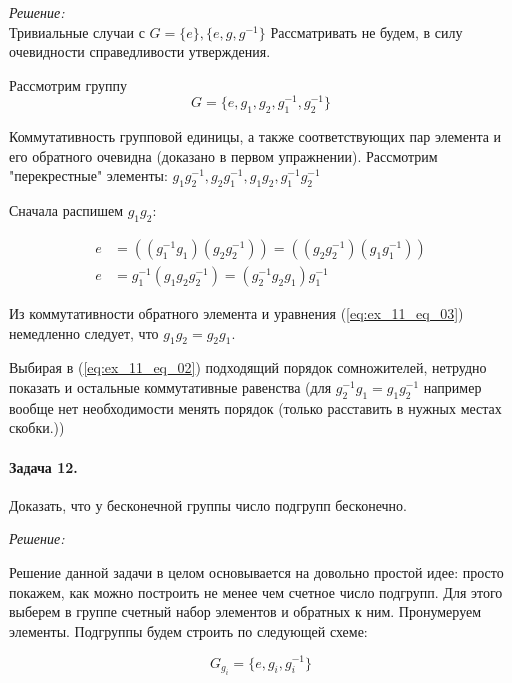 \documentclass[10pt,a4paper]{article}
\begin{document}
	\textit{Решение:}\\
	
	Тривиальные случаи с $G = \lbrace e \rbrace, \lbrace e, g, g^{-1}\rbrace$ 
	Рассматривать не будем, в силу очевидности справедливости утверждения.
	
	Рассмотрим группу 
	\begin{equation}
		\label{eq:ex_11_eq_01}
		G = \lbrace e, g_{1}, g_{2}, g^{-1}_{1}, g^{-1}_{2}\rbrace
	\end{equation}
	
	Коммутативность групповой единицы, а также соответствующих пар элемента и 
	его обратного очевидна (доказано в первом упражнении). Рассмотрим 
	"перекрестные" элементы: $g_{1}g_{2}^{-1}, g_{2}g_{1}^{-1}, g_{1}g_{2}, 
	g_{1}^{-1}g_{2}^{-1}$
	
	Сначала распишем $g_{1}g_{2}$:
	
	\begin{align}
		\label{eq:ex_11_eq_02}
		e &= \left(\left(g_{1}^{-1}g_{1}\right)\left(g_{2}g^{-1}_{2}\right)
		\right) = \left(\left(g_{2}g^{-1}_{2}\right)\left(g_{1}g_{1}^{-1}\right)
		\right)\\
		\label{eq:ex_11_eq_03}
		e &= g_{1}^{-1}\left(g_{1}g_{2}g_{2}^{-1}\right) = \left(g_{2}^{-1}g_{2}
		g_{1}\right)g_{1}^{-1}
	\end{align}
	
	Из коммутативности обратного элемента и уравнения (\ref{eq:ex_11_eq_03}) 
	немедленно следует, что $g_{1}g_{2} = g_{2}g_{1}$. 
	
	Выбирая в (\ref{eq:ex_11_eq_02}) подходящий порядок сомножителей, 
	нетрудно показать и остальные коммутативные равенства (для $g_{2}^{-1}g_{1}=
	g_{1}g_{2}^{-1}$ например вообще нет необходимости менять порядок (только 
	расставить в нужных местах скобки.))
	
	\paragraph{Задача 12.} Доказать, что у бесконечной группы число подгрупп 
	бесконечно.
	
	\textit{Решение:}
	
	Решение данной задачи в целом основывается на довольно простой идее: просто
	покажем, как можно построить не менее чем счетное число подгрупп. Для этого 
	выберем в группе счетный набор элементов и обратных к ним. Пронумеруем 
	элементы. Подгруппы будем строить по следующей схеме:
	
	\begin{equation}
		\label{eq:ex_12_eq_01}
		G_{g_{i}} = \lbrace e, g_{i}, g^{-1}_{i}\rbrace
	\end{equation}
	
\end{document}
